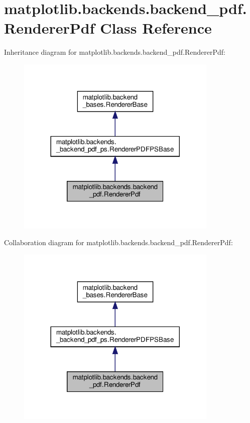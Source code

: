 \hypertarget{classmatplotlib_1_1backends_1_1backend__pdf_1_1RendererPdf}{}\section{matplotlib.\+backends.\+backend\+\_\+pdf.\+Renderer\+Pdf Class Reference}
\label{classmatplotlib_1_1backends_1_1backend__pdf_1_1RendererPdf}


Inheritance diagram for matplotlib.\+backends.\+backend\+\_\+pdf.\+Renderer\+Pdf\+:
\nopagebreak
\begin{figure}[H]
\begin{center}
\leavevmode
\includegraphics[width=272pt]{classmatplotlib_1_1backends_1_1backend__pdf_1_1RendererPdf__inherit__graph}
\end{center}
\end{figure}


Collaboration diagram for matplotlib.\+backends.\+backend\+\_\+pdf.\+Renderer\+Pdf\+:
\nopagebreak
\begin{figure}[H]
\begin{center}
\leavevmode
\includegraphics[width=272pt]{classmatplotlib_1_1backends_1_1backend__pdf_1_1RendererPdf__coll__graph}
\end{center}
\end{figure}
